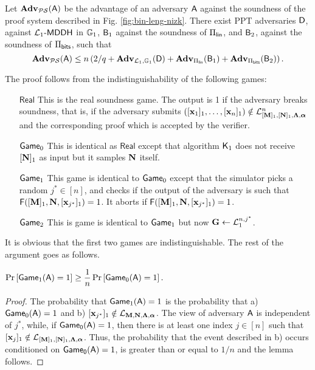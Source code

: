 \begin{theorem}
Let $\mathbf{Adv}_{\mathcal{PS}}(\mathsf{A})$ be the advantage of an adversary $\mathsf{A}$ against the soundness of the proof system described in Fig. \ref{fig:bin-leng-nizk}. There exist PPT adversaries $\mathsf{D}$, against $\mathcal{L}_1\mbox{-}\mathsf{MDDH}$ in $\mathbb{G}_1$, $\mathsf{B}_1$ against the soundness of $\Pi_{\mathsf{lin}}$, and $\mathsf{B}_2$, against the soundness of $\Pi_{\mathsf{bits}}$, such that
$$
\mathbf{Adv}_{\mathcal{PS}}(\mathsf{A})\leq n\left(2/q + \mathbf{Adv}_{\mathcal{L}_1,\mathbb{G}_1}(\mathsf{D})+\mathbf{Adv}_{\Pi_{\mathsf{lin}}}(\mathsf{B}_1)+\mathbf{Adv}_{\Pi_{\mathsf{bits}}}(\mathsf{B}_2)\right).
$$
\end{theorem}

The proof follows from the indistinguishability of the following games:
\begin{itemize}
\item[$\mathsf{Real}$] This is the real soundness game. The output is 1 if the adversary breaks soundness, that is, if the adversary submits $([\mathbf{x}_1]_1,\ldots,[\mathbf{x}_n]_1)\notin\mathcal{L}_{[\mathbf{{M}}]_1,[\mathbf{{N}}]_1,\mathbf{{\Lambda}},{\boldsymbol \alpha}}^n$ and the corresponding proof which is accepted by the verifier.
\item[$\mathsf{Game}_0$] This is identical as $\mathsf{Real}$ except that algorithm $\mathsf{K}_1$ does not receive $[\mathbf{{N}}]_1$ as input but it samples $\mathbf{{N}}$ itself.
\item[$\mathsf{Game}_1$] This game is identical to $\mathsf{Game}_0$ except that the simulator picks a random $j^*\in[n]$, and checks if the output of the adversary is such that $\mathsf{F}([\mathbf{{M}}]_1,\mathbf{{N}},[\mathbf{x}_{j^*}]_1)=1$. It aborts if $\mathsf{F}([\mathbf{{M}}]_1,\mathbf{{N}},[\mathbf{x}_{j^*}]_1)=1$.
\item[$\mathsf{Game}_2$] This is game is identical to $\mathsf{Game}_1$ but now $\mathbf{{G}} \gets \mathcal{L}_1^{n,j^*}$.
\end{itemize}

It is obvious that the first two games are indistinguishable. 
The rest of the argument goes as follows. 

\begin{lemma} $\Pr\left[ \mathsf{Game}_1(\mathsf{A})=1\right]\geq\dfrac{1}{n}\Pr\left[\mathsf{Game}_0(\mathsf{A})=1\right].$
\end{lemma}

\begin{proof}  The probability that
 $\mathsf{Game}_1(\mathsf{A})=1$ is the probability that  a) $\mathsf{Game}_0(\mathsf{A})=1$ and
b)  $[\mathbf{x}_{j^*}]_1 \notin \mathcal{L}_{\mathbf{{M}},\mathbf{{N}},\mathbf{{\Lambda}},{\boldsymbol \alpha}}$. The view of adversary $\mathsf{A}$ is independent of $j^*$, while, if $\mathsf{Game_0}(\mathsf{A})=1$, then there is at least one index $j \in [n]$ such that $[\mathbf{x}_{j}]_1 \notin \mathcal{L}_{[\mathbf{{M}}]_1,[\mathbf{{N}}]_1,\mathbf{{\Lambda}},{\boldsymbol \alpha}}$. Thus, 
the probability that the event described in b) occurs conditioned on $\mathsf{Game_0}(\mathsf{A})=1$, is greater than or equal to $1/n$ and the lemma follows.
\end{proof}

